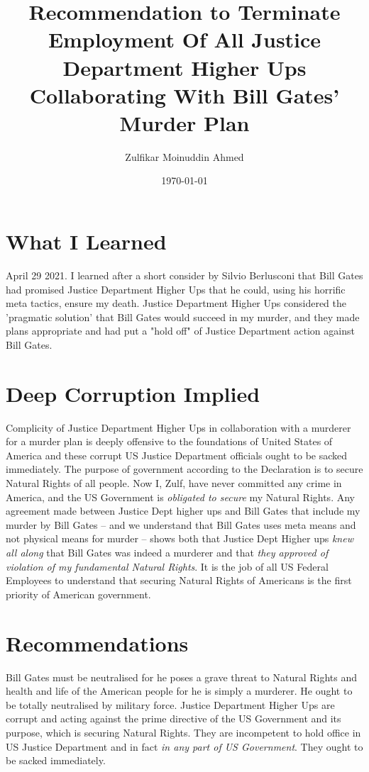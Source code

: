 \documentclass{amsart}
\title{Recommendation to Terminate Employment Of All Justice Department Higher Ups Collaborating With Bill Gates' Murder Plan}
\author{Zulfikar Moinuddin Ahmed}
\date{\today}
\begin{document}
\maketitle

\section{What I Learned}

April 29 2021.  I learned after a short consider by Silvio Berlusconi that Bill Gates had promised Justice Department Higher Ups that he could, using his horrific meta tactics, ensure my death.  Justice Department Higher Ups considered the 'pragmatic solution' that Bill Gates would succeed in my murder, and they made plans appropriate and had put a "hold off" of Justice Department action against Bill Gates.

\section{Deep Corruption Implied}

Complicity of Justice Department Higher Ups in collaboration with a murderer for a murder plan is deeply offensive to the foundations of United States of America and these corrupt US Justice Department officials ought to be sacked immediately.  The purpose of government according to the Declaration is to secure Natural Rights of all people.  Now I, Zulf, have never committed any crime in America, and the US Government is {\em obligated to secure} my Natural Rights.  Any agreement made between Justice Dept higher ups and Bill Gates that include my murder by Bill Gates -- and we understand that Bill Gates uses meta means and not physical means for murder -- shows both that Justice Dept Higher ups {\em knew all along} that Bill Gates was indeed a murderer and that {\em they approved of violation of my fundamental Natural Rights}.  It is the job of all US Federal Employees to understand that securing Natural Rights of Americans is the first priority of American government.

\section{Recommendations}

Bill Gates must be neutralised for he poses a grave threat to Natural Rights and health and life of the American people for he is simply a murderer.  He ought to be totally neutralised by military force.  Justice Department Higher Ups are corrupt and acting against the prime directive of the US Government and its purpose, which is securing Natural Rights.  They are incompetent to hold office in US Justice Department and in fact {\em in any part of US Government}.  They ought to be sacked immediately.
\end{document}
